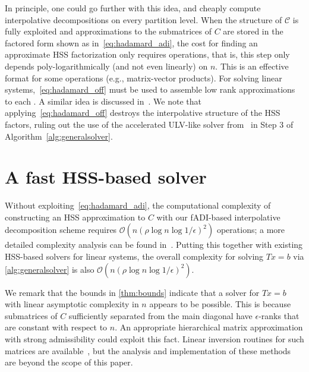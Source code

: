 \documentclass[final,reqno,onefignum,onetabnum]{siamart190516}
\begin{document}
In principle, one could go further with this idea, and cheaply compute interpolative decompositions  on every partition level. When the structure of $\mathscr{C}$ is fully exploited and approximations to the submatrices of $C$ are stored in the factored form shown as in~\eqref{eq:hadamard_adi}, the cost for finding an approximate HSS factorization only requires  operations, that is, this step only depends poly-logarithmically (and not even linearly) on $n$.  This is an effective format for some operations (e.g., matrix-vector products). For solving linear systems,~\eqref{eq:hadamard_off} must be used to assemble low rank approximations to each . A similar idea is discussed in~\cite{chandrasekaran2007superfast, xia2012superfast}. We note that applying~\eqref{eq:hadamard_off} destroys the interpolative structure of the HSS factors, ruling out the use of the accelerated ULV-like solver from~\cite{xia2012superfast} in Step 3 of Algorithm~\ref{alg:generalsolver}.

\section{A fast HSS-based solver} \label{sec:practicalsolver}

Without exploiting~\eqref{eq:hadamard_adi}, the computational complexity of constructing an HSS approximation to $C$ with our fADI-based interpolative decomposition scheme requires $\mathcal{O}(n (\rho \log n \log 1/\epsilon )^2 )$ operations; a more detailed complexity
analysis can be found in~\cite[Ch.~4]{wilber2021computing}. Putting this together with existing HSS-based solvers for linear systems, the overall complexity for solving $Tx = b$ via \cref{alg:generalsolver} is also $\mathcal{O}(n (\rho \log n \log 1/\epsilon )^2 )$. 

We remark that the bounds in \cref{thm:bounds} indicate that a solver for $Tx=b$ with linear asymptotic complexity in $n$ appears to be possible. This is because submatrices of $C$ sufficiently separated from the main diagonal have $\epsilon$-ranks that are constant with respect to $n$. An appropriate hierarchical matrix approximation with strong admissibility could exploit this fact. Linear inversion routines for such matrices are available~\cite{ambikasaran2014inverse, minden2017recursive}, but the analysis and implementation of these methods are beyond the scope of this paper.
\end{document}
